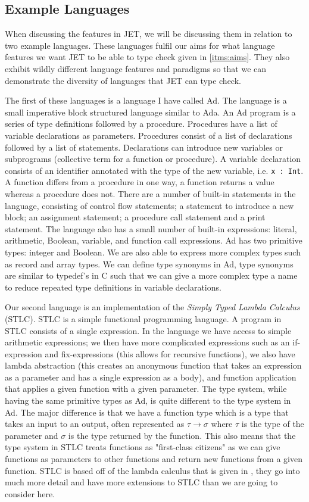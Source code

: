 \subsection{Example Languages}
\label{sec:exampleLanguages}
When discussing the features in JET, we will be discussing them in relation to two example languages.
These languages fulfil our aims for what language features we want JET to be able to type check given in \autoref{itms:aims}.
They also exhibit wildly different language features and paradigms so that we can demonstrate the diversity of languages that JET can type check.

The first of these languages is a language I have called Ad.
The language is a small imperative block structured language similar to Ada.
An Ad program is a series of type definitions followed by a procedure.
Procedures have a list of variable declarations as parameters.
Procedures consist of a list of declarations followed by a list of statements.
Declarations can introduce new variables or subprograms (collective term for a function or procedure).
A variable declaration consists of an identifier annotated with the type of the new variable, i.e. \texttt{x : Int}.
A function differs from a procedure in one way, a function returns a value whereas a procedure does not.
There are a number of built-in statements in the language, consisting of control flow statements; a statement to introduce a new block; an assignment statement; a procedure call statement and a print statement. 
The language also has a small number of built-in expressions: literal, arithmetic, Boolean, variable, and function call expressions.
Ad has two primitive types: integer and Boolean.
We are also able to express more complex types such as record and array types.
We can define type synonyms in Ad, type synonyms are similar to typedef's in C such that we can give a more complex type a name to reduce repeated type definitions in variable declarations.

Our second language is an implementation of the \textit{Simply Typed Lambda Calculus} (STLC).
STLC is a simple functional programming language.
A program in STLC consists of a single expression.
In the language we have access to simple arithmetic expressions; we then have more complicated expressions such as an if-expression and fix-expressions (this allows for recursive functions), we also have lambda abstraction (this creates an anonymous function that takes an expression as a parameter and has a single expression as a body), and function application that applies a given function with a given parameter.
The type system, while having the same primitive types as Ad, is quite different to the type system in Ad.
The major difference is that we have a function type which is a type that takes an input to an output, often represented as $\tau \rightarrow \sigma$ where $\tau$ is the type of the parameter and $\sigma$ is the type returned by the function.
This also means that the type system in STLC treats functions as "first-class citizens" as we can give functions as parameters to other functions and return new functions from a given function.
STLC is based off of the lambda calculus that is given in \textcite{pierce2002types}, they go into much more detail and have more extensions to STLC than we are going to consider here.

